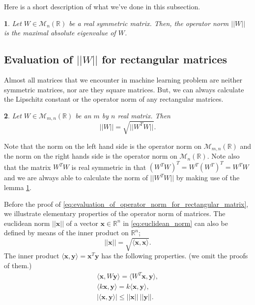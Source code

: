 \documentclass[12pt]{report}
\numberwithin{figure}{chapter}
\theoremstyle{plain}
\newtheorem{theorem}{\protect\theoremname}[chapter]
\theoremstyle{definition}
\theoremstyle{corollary}
\theoremstyle{definition}
\theoremstyle{plain}
\theoremstyle{definition}
\theoremstyle{plain}
\newtheorem{lemma}[theorem]{\protect\lemmaname}
\providecommand{\lemmaname}{Lemma}
\providecommand{\theoremname}{Theorem}
\newcommand\bx{\ensuremath{\boldsymbol x}}
\newcommand\by{\ensuremath{\boldsymbol y}}
\begin{document}
Here is a short description of what we've done in this subsection.
\begin{lemma}\label{lemm:evaluation_for_square_matrices}
Let \(W\in\mathcal M_n(\mathbb R)\) be a real symmetric matrix.
Then, the operator norm \(||W||\) is the maximal absolute eigenvalue of \(W\).
\end{lemma}

%
\subsection{Evaluation of \(||W||\) for rectangular matrices}\label{sec:evaluation_for_rectangular_matrices}
Almost all matrices that we encounter in machine learning problem are neither symmetric matrices, nor are they square matrices.
But, we can always calculate the Lipschitz constant or the operator norm of any rectangular matrices.

\begin{theorem}\label{theo:evaluation_for_rectangular_matrices}
\cite{KC}
Let \(W\in\mathcal M_{m,n}(\mathbb R)\) be an \(m\) by \(n\) real matrix.
Then
\begin{equation}\label{eq:evaluation_of_operator_norm_for_rectangular_matrix}
||W||=\sqrt{||W^TW||}.
\end{equation}
\end{theorem}

Note that the norm on the left hand side is the operator norm on \(\mathcal M_{m,n}(\mathbb R)\) and the norm on the right hands side is the operator norm on \(\mathcal M_n(\mathbb R)\).
Note also that the matrix \(W^TW\) is real symmetric in that \((W^TW)^T=W^T(W^T)^T=W^TW\) and we are always able to calculate the norm of \(||W^TW||\) by making use of the lemma \ref{lemm:evaluation_for_square_matrices}.

Before the proof of \eqref{eq:evaluation_of_operator_norm_for_rectangular_matrix}, we illustrate elementary properties of the operator norm of matrices.
The euclidean norm \(||\bx||\) of a vector \(\bx\in\mathbb R^n\) in \eqref{eq:euclidean_norm} can also be defined by means of the inner product on \(\mathbb R^n\);
\begin{equation}\label{eq:euclidean norm_2}
||\bx||=\sqrt{\langle \bx,\bx\rangle}.
\end{equation}
The inner product \(\langle \bx,\by\rangle=\bx^T\by\) has the following properties. (we omit the proofs of them.)
\begin{gather*}
\langle \bx,W\by\rangle=\langle W^T\bx,\by\rangle,\\
\langle k\bx,\by\rangle=k\langle \bx,\by\rangle,\\
|\langle\bx,\by\rangle|\le||\bx||\:||\by||.
\end{gather*}
\end{document}

